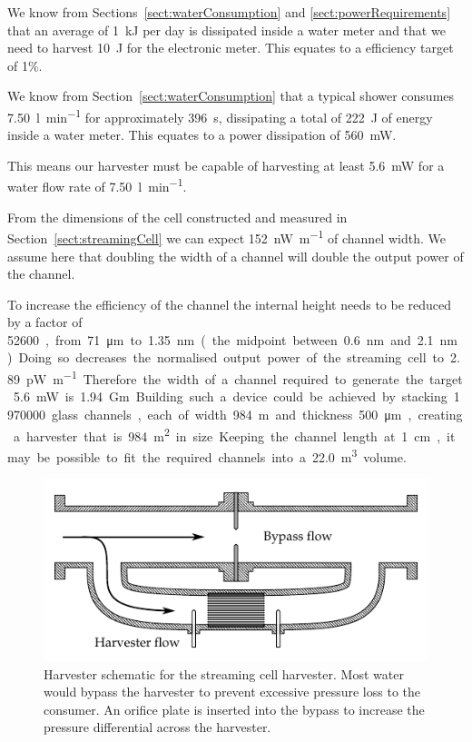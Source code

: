 \documentclass[10pt,final,journal]{IEEEtran}
\begin{document}
    We know from Sections~\ref{sect:waterConsumption} and \ref{sect:powerRequirements} that an average of \SI{1}{\kilo\joule} per day is dissipated inside a water meter and that we need to harvest \SI{10}{\joule} for the electronic meter.
    This equates to a efficiency target of 1\%.

    We know from Section~\ref{sect:waterConsumption} that a typical shower consumes \SI{7.50}{\litre\per\minute} for approximately \SI{396}{\second}, dissipating a total of \SI{222}{\joule} of energy inside a water meter.
    This equates to a power dissipation of \SI{560}{\milli\watt}.

    This means our harvester must be capable of harvesting at least \SI{5.6}{\milli\watt} for a water flow rate of \SI{7.50}{\litre\per\minute}.

    From the dimensions of the cell constructed and measured in Section~\ref{sect:streamingCell} we can expect \SI{152}{\nano\watt\per\metre} of channel width.
    We assume here that doubling the width of a channel will double the output power of the channel.
    
    To increase the efficiency of the channel the internal height needs to be reduced by a factor of \SI{52 600}, from \SI{71}{\micro\metre} to \SI{1.35}{\nano\metre} (the midpoint between \SI{0.6}{\nano\metre} and \SI{2.1}{\nano\metre}).
    Doing so decreases the normalised output power of the streaming cell to \SI{2.89}{\pico\watt\per\metre}.
    Therefore the width of a channel required to generate the target \SI{5.6}{\milli\watt} is \SI{1.94}{\giga\metre}.

    Building such a device could be achieved by stacking \SI{1970000} glass channels, each of width \SI{984}{\metre} and thickness \SI{500}{\micro\metre}, creating a harvester that is \SI{984}{\square\metre} in size.
    Keeping the channel length at \SI{1}{\centi\meter}, it may be possible to fit the required channels into a \SI{22.0}{\cubic\meter} volume.

    \begin{figure}
        \begin{center}
        \includegraphics[]{harvester2}
        \end{center}
        \caption{Harvester schematic for the streaming cell harvester.
        Most water would bypass the harvester to prevent excessive pressure loss to the consumer.
        An orifice plate is inserted into the bypass to increase the pressure differential across the harvester.}
        \label{fig:harvester}
    \end{figure}
\end{document}

